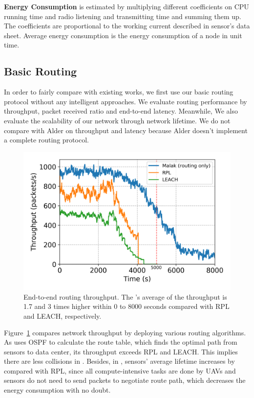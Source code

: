 \textbf{Energy Consumption} is estimated by multiplying different coefficients on
CPU running time and radio listening and transmitting time and summing them up.
The coefficients are proportional to the working current described in sensor's
data sheet. Average energy consumption is the energy consumption of a node in
unit time.

\subsection{Basic Routing}

In order to fairly compare with existing works, we first use our basic
{\sdn} routing protocol without any intelligent approaches. We evaluate routing
performance by throughput, packet received ratio and end-to-end latency.
Meanwhile, We also evaluate the scalability of our network through network
lifetime. We do not compare {\sdn} with Alder on throughput and latency because
Alder doesn't implement a complete routing protocol.

\begin{figure}[!h]
	\centering
	\includegraphics[width=.95\columnwidth]{Figure/throughput}
	\vspace{-0.1in}
	\caption{End-to-end routing throughput.
		\textnormal{
			The {\sdn}'s average of the throughput is 1.7 and 3 times higher within 0
			to 8000 seconds compared with RPL and LEACH, respectively.
	}}
	\label{fig:throughput}
\end{figure}

Figure~\ref{fig:throughput} compares network throughput by deploying various
routing algorithms. As {\sdn} uses OSPF to calculate the route table, which
finds the optimal path from sensors to data center, its throughput exceeds RPL
and LEACH. This implies there are less collisions in {\sdn}. Besides, in {\sdn},
sensors' average lifetime increases by {\totalLife} compared with RPL, since all
compute-intensive tasks are done by UAVs and sensors do not need to send
packets to negotiate route path, which decreases the energy consumption with no
doubt.

